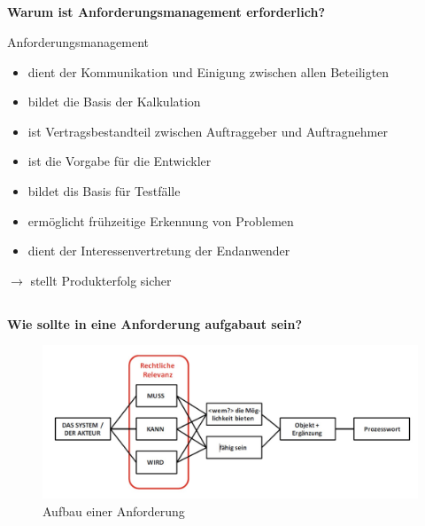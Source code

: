 \subsection{}
\textbf{Warum ist Anforderungsmanagement erforderlich?}

Anforderungsmanagement
\begin{itemize}
    \item dient der Kommunikation und Einigung zwischen allen Beteiligten
    \item bildet die Basis der Kalkulation
    \item ist Vertragsbestandteil zwischen Auftraggeber und Auftragnehmer
    \item ist die Vorgabe für die Entwickler
    \item bildet dis Basis für Testfälle
    \item ermöglicht frühzeitige Erkennung von Problemen
    \item dient der Interessenvertretung der Endanwender
\end{itemize}
$\rightarrow$ stellt Produkterfolg sicher
\subsection{}
\textbf{Wie sollte in eine Anforderung aufgabaut sein?}
\begin{figure}[H]
    \centering
    \includegraphics[width=.8\linewidth]{Graphics/Anforderung_Aufbau.jpg}
    \caption{Aufbau einer Anforderung}
\end{figure}